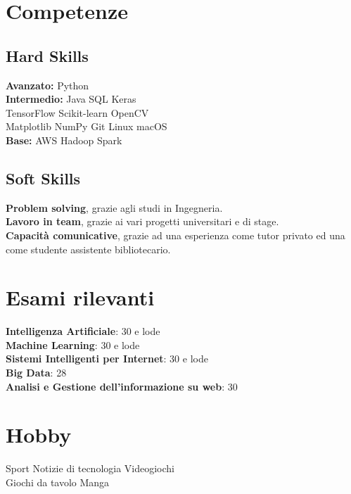 \documentclass[]{deedy-resume-openfont}
\begin{document}
\begin{minipage}[t]{0.33\textwidth}

\section{Competenze}

\subsection{Hard Skills}
\textbf{Avanzato:} Python \\
\textbf{Intermedio:} Java \textbullet{} SQL \textbullet{} Keras \\
TensorFlow \textbullet{} Scikit-learn \textbullet{} OpenCV \\
Matplotlib \textbullet{} NumPy \textbullet{} Git \textbullet{} Linux \textbullet{} macOS \\
\textbf{Base:} AWS \textbullet{} Hadoop \textbullet{} Spark
\sectionsep

\subsection{Soft Skills}
\textbf{Problem solving}, grazie agli studi in Ingegneria. \\
\textbf{Lavoro in team}, grazie ai vari progetti universitari e di stage. \\
\textbf{Capacità comunicative}, grazie ad una esperienza come tutor privato ed una come studente assistente bibliotecario.
\sectionsep


\section{Esami rilevanti}
\textbf{Intelligenza Artificiale}: 30 e lode \\
\textbf{Machine Learning}: 30 e lode \\
\textbf{Sistemi Intelligenti per Internet}: 30 e lode \\
\textbf{Big Data}: 28 \\
\textbf{Analisi e Gestione dell'informazione su web}: 30
\sectionsep


\section{Hobby}
Sport \textbullet{} Notizie di tecnologia \textbullet{} Videogiochi \\
Giochi da tavolo \textbullet{} Manga

%
%

\end{minipage}
\end{document}
